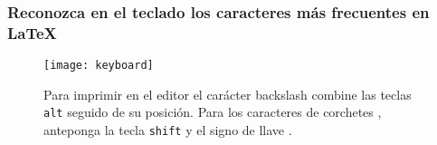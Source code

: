 \begin{frame}
  \frametitle{Reconozca en el teclado los caracteres más frecuentes en \LaTeX}

  \begin{figure}[ht!]
    \centering
    \texttt{[image: keyboard]}
    \caption{Para imprimir en el editor el carácter backslash
      \keystrokebftt{\bs} combine las teclas \texttt{alt} seguido de
      su posición.
      Para los caracteres de corchetes
      \keystrokebftt{[} \keystrokebftt{]}, anteponga la tecla
    \texttt{shift} y el signo de llave \keystrokebftt{\{} \keystrokebftt{\}}.}
  \end{figure}
\end{frame}
